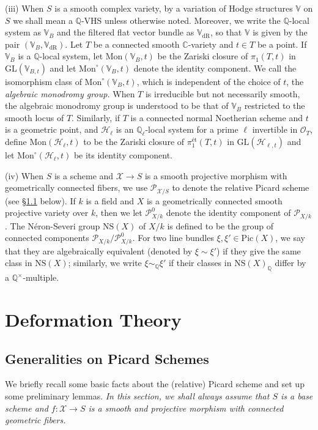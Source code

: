 \documentclass[letter, 11pt]{article}
\theoremstyle{plain}
\theoremstyle{definition}
\newcommand{\IC}{\mathbb{C}}
\newcommand{\IQ}{\mathbb{Q}}
\newcommand{\IV}{\mathbb{V}}
\newcommand{\<}{\langle}
\renewcommand{\>}{\rangle}
\newcommand{\sH}{\mathcal{H}}
\newcommand{\sX}{\mathcal{X}}
\newcommand{\sO}{\mathcal{O}}
\newcommand{\Pic}{\mathrm{Pic}}
\newcommand{\shP}{\mathscr{P}}
\newcommand{\dR}{\mathrm{dR}}
\newcommand{\et}{\textrm{{\'e}t}}
\newcommand{\NS}{\mathrm{NS}}
\newcommand{\GL}{\mathrm{GL}}
\newcommand{\Mon}{\mathrm{Mon}}
\begin{document}
(iii) When $S$ is a smooth complex variety, by a variation of Hodge structures $\IV$ on $S$ we shall mean a $\IQ$-VHS unless otherwise noted. Moreover, we write the $\IQ$-local system as $\IV_B$ and the filtered flat vector bundle as $\IV_\dR$, so that $\IV$ is given by the pair $(\IV_B, \IV_\dR)$. Let $T$ be a connected smooth $\IC$-variety and $t \in T$ be a point. If $\IV_B$ is a $\IQ$-local system, let $\mathrm{Mon}(\IV_B, t)$ be the Zariski closure of $\pi_1(T, t)$ in $\GL(\IV_{B, t})$ and let $\mathrm{Mon}^\circ(\IV_B, t)$ denote the identity component. We call the isomorphism class of $\mathrm{Mon}^\circ(\IV_B, t)$, which is independent of the choice of $t$, the \textit{algebraic monodromy group.} When $T$ is irreducible but not necessarily smooth, the algebraic monodromy group is understood to be that of $\IV_B$ restricted to the smooth locus of $T$. Similarly, if $T$ is a connected normal Noetherian scheme and $t$ is a geometric point, and $\sH_\ell$ is an $\IQ_\ell$-local system for a prime $\ell$ invertible in $\sO_T$, define $\Mon(\sH_\ell, t)$ to be the Zariski closure of $\pi_1^\et(T, t)$ in $\GL(\sH_{\ell, t})$ and let $\Mon^\circ(\sH_\ell, t)$ be its identity component.

(iv) When $S$ is a scheme and $\sX \to S$ is a smooth projective morphism with geometrically connected fibers, we use $\shP_{\sX/S}$ to denote the relative Picard scheme (see \S\ref{sec: generalities} below). If $k$ is a field and $X$ is a geometrically connected smooth projective variety over $k$, then we let $\shP^0_{X/k}$ denote the identity component of $\shP_{X/k}$. The N\'eron-Severi group $\NS(X)$ of $X/k$ is defined to be the group of connected components $\shP_{X/k} / \shP^0_{X/k}$. For two line bundles $\xi, \xi' \in \Pic(X)$, we say that they are algebraically equivalent (denoted by $\xi \sim \xi'$) if they give the same class in $\NS(X)$; similarly, we write $\xi \sim_\IQ \xi'$ if their classes in $\NS(X)_\IQ$ differ by a $\IQ^\times$-multiple.  


\section{Deformation Theory}

\subsection{Generalities on Picard Schemes}
\label{sec: generalities}
We briefly recall some basic facts about the (relative) Picard scheme and set up some preliminary lemmas. \textit{In this section, we shall always assume that $S$ is a base scheme and $f : \sX \to S$ is a smooth and projective morphism with connected geometric fibers.}
\end{document}
